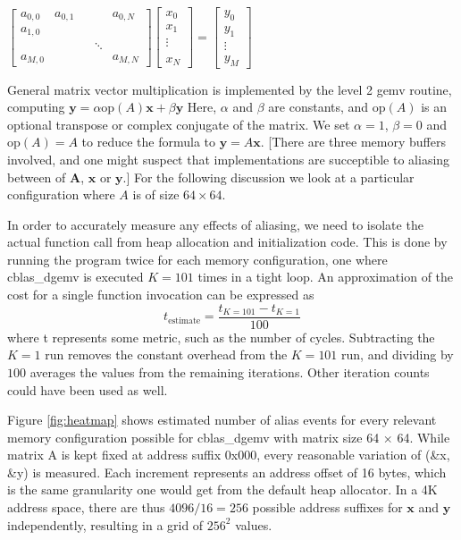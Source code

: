 \documentclass[a4paper,10pt,twocolumn,twoside]{article}
\begin{document}
$
\left[\begin{array}{ccccc}
a_{0,0} & a_{0,1} &  &  & a_{0,N}\\
a_{1,0}\\
 &  &  & \ddots\\
a_{M,0} &  &  &  & a_{M,N}
\end{array}\right]\left[\begin{array}{c}
x_{0}\\
x_{1}\\
\vdots\\
\\
x_{N}
\end{array}\right]=\left[\begin{array}{c}
y_{0}\\
y_{1}\\
\vdots\\
y_{M}
\end{array}\right]
$

General matrix vector multiplication is implemented by the level 2 gemv routine, computing $\boldsymbol{y} = \alpha\text{op}\left(A\right)\boldsymbol{x} + \beta\boldsymbol{y}$
Here, $\alpha$ and $\beta$ are constants, and $\text{op}\left(A\right)$ is an optional transpose or complex conjugate of the matrix. 
We set $\alpha = 1$, $\beta = 0$ and $\text{op} \left(A\right) = A$ to reduce the formula to $\boldsymbol{y}=A\boldsymbol{x}$.
[There are three memory buffers involved, and one might suspect that implementations are succeptible to aliasing between of $\boldsymbol{A}$, $\boldsymbol{x}$ or $\boldsymbol{y}$.]
For the following discussion we look at a particular configuration where $A$ is of size $64\times64$.

In order to accurately measure any effects of aliasing, we need to isolate the actual function call from heap allocation and initialization code.
This is done by running the program twice for each memory configuration, one where cblas\_dgemv is executed $K = 101$ times in a tight loop.
An approximation of the cost for a single function invocation can be expressed as 
$$
t_{\text{estimate}}=\frac{t_{K=101}-t_{K=1}}{100}
$$
where t represents some metric, such as the number of cycles.
Subtracting the $K = 1$ run removes the constant overhead from the $K = 101$ run, and dividing by $100$ averages the values from the remaining iterations.
Other iteration counts could have been used as well.

Figure \ref{fig:heatmap} shows estimated number of alias events for every relevant memory configuration possible for cblas\_dgemv with matrix size 64 $\times$ 64. 
While matrix A is kept fixed at address suffix 0x000, every reasonable variation of (\&x, \&y) is measured.
Each increment represents an address offset of 16 bytes, which is the same granularity one would get from the default heap allocator.
In a 4K address space, there are thus $4096/16 = 256$ possible address suffixes for $\boldsymbol{x}$ and $\boldsymbol{y}$ independently, resulting in a grid of $256^2$ values.
\end{document}
